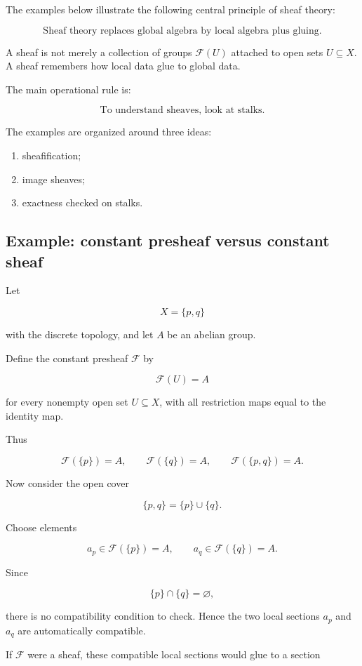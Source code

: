 \documentclass[12pt,a4paper]{article}
\theoremstyle{notespace}
\newcommand{\F}{\mathcal F}
\begin{document}
	The examples below illustrate the following central principle of sheaf theory:
	
	\[
	\boxed{
		\text{Sheaf theory replaces global algebra by local algebra plus gluing.}
	}
	\]
	
	A sheaf is not merely a collection of groups $\F(U)$ attached to open sets
	$U \subseteq X$. A sheaf remembers how local data glue to global data.
	
	The main operational rule is:
	
	\[
	\boxed{
		\text{To understand sheaves, look at stalks.}
	}
	\]
	
	The examples are organized around three ideas:
	
	\begin{enumerate}
		\item sheafification;
		\item image sheaves;
		\item exactness checked on stalks.
	\end{enumerate}
	
	\subsection{Example: constant presheaf versus constant sheaf}
	
	Let
	
	\[
	X=\{p,q\}
	\]
	
	with the discrete topology, and let $A$ be an abelian group.
	
	Define the constant presheaf $\F$ by
	
	\[
	\F(U)=A
	\]
	
	for every nonempty open set $U \subseteq X$, with all restriction maps equal to
	the identity map.
	
	Thus
	
	\[
	\F(\{p\})=A,
	\qquad
	\F(\{q\})=A,
	\qquad
	\F(\{p,q\})=A.
	\]
	
	Now consider the open cover
	
	\[
	\{p,q\}=\{p\}\cup\{q\}.
	\]
	
	Choose elements
	
	\[
	a_p\in \F(\{p\})=A,
	\qquad
	a_q\in \F(\{q\})=A.
	\]
	
	Since
	
	\[
	\{p\}\cap\{q\}=\varnothing,
	\]
	
	there is no compatibility condition to check. Hence the two local sections
	$a_p$ and $a_q$ are automatically compatible.
	
	If $\F$ were a sheaf, these compatible local sections would glue to a section
	
\end{document}
